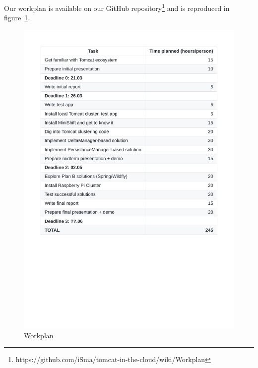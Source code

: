 \documentclass[11pt,a4paper]{article}
\begin{document}
Our workplan is available on our GitHub
repository\footnote{https://github.com/iSma/tomcat-in-the-cloud/wiki/Workplan}
and is reproduced in figure~\ref{fig:workplan}.

\begin{figure}[h]
    \centering
    \includegraphics[trim=400 150 400 0]{workplan}
    \caption{Workplan}\label{fig:workplan}
\end{figure}
\end{document}
